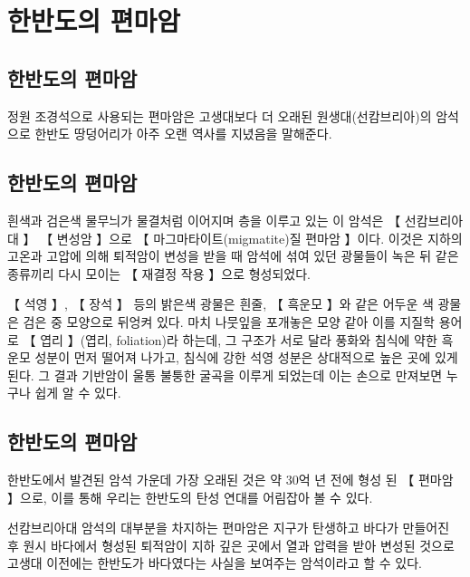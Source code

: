 \documentclass[12pt, a4paper, twoside]{book}
\begin{document}
	\clearpage
	\section{한반도의 편마암}



		\subsection{한반도의 편마암}

			정원 조경석으로 사용되는 편마암은 고생대보다 더 오래된 원생대(선캄브리아)의 암석으로 한반도 땅덩어리가 아주 오랜 역사를 지녔음을 말해준다.

		\subsection{한반도의 편마암}

				흰색과 검은색 물무늬가 물결처럼 이어지며 층을 이루고 있는 이 암석은 【 선캄브리아대 】 【 변성암 】으로 【 마그마타이트(migmatite)질 편마암 】이다. 
				이것은 지하의 고온과 고압에 의해 퇴적암이 변성을 받을 때 암석에 섞여 있던 광물들이 녹은 뒤 같은 종류끼리 다시 모이는 【 재결정 작용 】으로 형성되었다.

				【 석영 】, 【 장석 】 등의 밝은색 광물은 흰줄, 【 흑운모 】와 같은 어두운 색 광물은 검은 중 모양으로 뒤엉켜 있다. 
				마치 나뭇잎을 포개놓은 모양 같아 이를 지질학 용어로 【 엽리 】(엽리, foliation)라 하는데, 
				그 구조가 서로 달라 풍화와 침식에 약한 흑운모 성분이 먼저 떨어져 나가고, 침식에 강한 석영 성분은 상대적으로 높은 곳에 있게 된다. 
				그 결과 기반암이 울통 불퉁한 굴곡을 이루게 되었는데 이는 손으로 만져보면 누구나 쉽게 알 수 있다.



		\subsection{한반도의 편마암}

				한반도에서 발견된 암석 가운데 가장 오래된 것은 약 30억 년 전에 형성 된 【 편마암 】으로, 이를 통해 우리는 한반도의 탄성 연대를 어림잡아 볼 수 있다. 

				선캄브리아대 암석의 대부분을 차지하는 편마암은 지구가 탄생하고 바다가 만들어진 후 원시 바다에서 형성된 퇴적암이 지하 깊은 곳에서 열과 압력을 받아 변성된 것으로 
				고생대 이전에는 한반도가 바다였다는 사실을 보여주는 암석이라고 할 수 있다.
\end{document}
